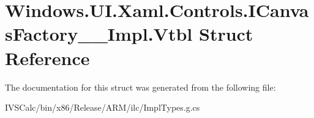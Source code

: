 \hypertarget{struct_windows_1_1_u_i_1_1_xaml_1_1_controls_1_1_i_canvas_factory_____impl_1_1_vtbl}{}\section{Windows.\+U\+I.\+Xaml.\+Controls.\+I\+Canvas\+Factory\+\_\+\+\_\+\+Impl.\+Vtbl Struct Reference}
\label{struct_windows_1_1_u_i_1_1_xaml_1_1_controls_1_1_i_canvas_factory_____impl_1_1_vtbl}


The documentation for this struct was generated from the following file\+:\begin{DoxyCompactItemize}
\item 
I\+V\+S\+Calc/bin/x86/\+Release/\+A\+R\+M/ilc/Impl\+Types.\+g.\+cs\end{DoxyCompactItemize}
